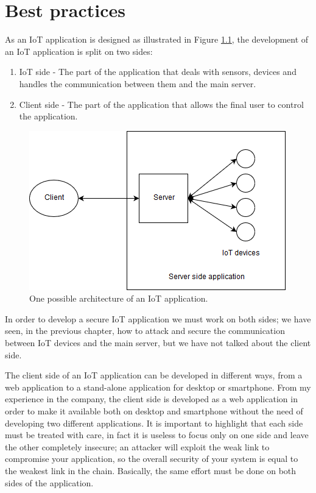 \chapter{Best practices}\label{ch:best}
As an IoT application is designed as illustrated in Figure \ref{fig:best0}, the development of an IoT application is split on two sides:
\begin{enumerate}
	\item IoT side - The part of the application that deals with sensors, devices and handles the communication between them and the main server.
	\item Client side - The part of the application that allows the final user to control the application.
\end{enumerate}


	\begin{figure}
	\includegraphics[width=\linewidth]{bestpractice-img0.png}
	\caption{One possible architecture of an IoT application.}
	\label{fig:best0}
\end{figure}

In order to develop a secure IoT application we must work on both sides; we have seen, in the previous chapter, how to attack and secure the communication between IoT devices and the main server, but we have not talked about the client side.\newline

The client side of an IoT application can be developed in different ways, from a web application to a stand-alone application for desktop or smartphone.\newline
From my experience in the company, the client side is developed as a web application in order to make it available both on desktop and smartphone without the need of developing two different applications.\newline
It is important to highlight that each side must be treated with care, in fact it is useless to focus only on one side and leave the other completely insecure; an attacker will exploit the weak link to compromise your application, so the overall security of your system is equal to the weakest link in the chain.\newline
Basically, the same effort must be done on both sides of the application.\newline

